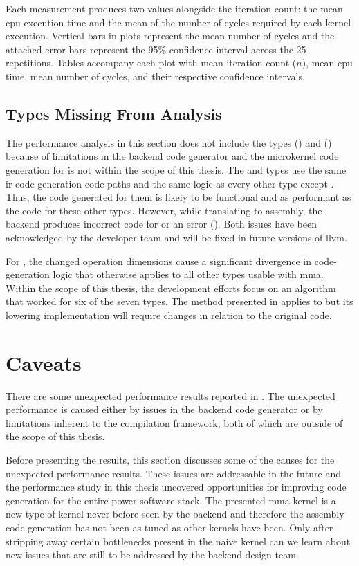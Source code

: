 \documentclass[\main/thesis.tex]{subfiles}
\begin{document}
Each measurement produces two values alongside the iteration count: the mean \gls{cpu} execution time and the mean of the number of cycles required by each kernel execution.
Vertical bars in plots represent the mean number of cycles and the attached error bars represent the 95\% confidence interval across the 25 repetitions.
Tables accompany each plot with mean iteration count ($n$), mean \gls{cpu} time, mean number of cycles, and their respective confidence intervals.

\subsection{Types Missing From Analysis}
The performance analysis in this section does not include the types () and () because of limitations in the backend code generator and the microkernel code generation for  is not within the scope of this thesis.
The  and  types use the same \gls{ir} code generation code paths and the same logic as every other type except .
Thus, the code generated for them is  likely to be functional and as performant as the code for these other types.
However, while translating to assembly, the backend produces incorrect code for  or an error ().
Both issues have been acknowledged by the developer team and will be fixed in future versions of \gls{llvm}.

For , the changed operation dimensions cause a significant divergence in code-generation logic that otherwise applies to all other types usable with \gls{mma}.
Within the scope of this thesis, the development efforts focus on an algorithm that worked for six of the seven types.
The method presented in  applies to  but its \gls{lowering} implementation will require changes in relation to the original code.

\section{Caveats}
\label{sec:caveats}
There are some unexpected performance results reported in .
The unexpected performance is caused either by issues in the backend code generator or by limitations inherent to the compilation framework, both of which are outside of the scope of this thesis.

Before presenting the results, this section discusses some of the causes for the unexpected performance results.
These issues are addressable in the future and the performance study in this thesis uncovered opportunities for improving code generation for the entire \gls{power} software stack.
The presented \gls{mma} kernel is a new type of kernel never before seen by the backend and therefore the assembly code generation has not been as tuned as other kernels have been.
Only after stripping away certain bottlenecks present in the naive kernel can we learn about new issues that are still to be addressed by the backend design team.
\end{document}
